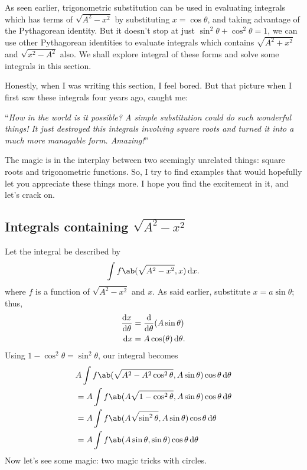 As seen earlier, trigonometric substitution can be used in evaluating integrals which has terms of \(\sqrt{A^2 - x^2}\) by substituting \(x = \cos\theta\), and taking advantage of the Pythagorean identity. But it doesn't stop at just \(\sin^2\theta + \cos^2\theta = 1\), we can use other Pythagorean identities to evaluate integrals which contains \(\sqrt{A^2 + x^2}\) and \(\sqrt{x^2 - A^2}\) also. We shall explore integral of these forms and solve some integrals in this section.

Honestly, when I was writing this section, I feel bored. But that picture when I first saw these integrals four years ago, caught me:
\begin{displayquote}
  \enquote{\emph{How in the world is it possible? A simple substitution could do such wonderful things! It just destroyed this integrals involving square roots and turned it into a much more managable form. Amazing!}}
\end{displayquote}
The magic is in the interplay between two seemingly unrelated things: square roots and trigonometric functions. So, I try to find examples that would hopefully let you appreciate these things more. I hope you find the excitement in it, and let's crack on.

\subsection*{Integrals containing \(\sqrt{A^2 - x^2}\)}

Let the integral be described by
\begin{equation}
  \int f\ab(\sqrt{A^2 - x^2}, x)\odif{x}.
\end{equation}
where \(f\) is a function of \(\sqrt{A^2 - x^2}\) and \(x\). As said earlier, substitute \(x = a\sin\theta\); thus,
\begin{align}
  \odv{x}{\theta} & = \odv*{(A\sin\theta)}{\theta} \\
  \odif{x}        & = A\cos(\theta)\odif{\theta}.
\end{align}
Using \(1 - \cos^2\theta = \sin^2\theta\), our integral becomes
\begin{align}
   & A\int f\ab(\sqrt{A^2 - A^2\cos^2\theta}, A\sin\theta)\cos\theta\odif{\theta} \nonumber \\
   & = A\int f\ab(A\sqrt{1 - \cos^2\theta}, A\sin\theta)\cos\theta\odif{\theta}             \\
   & = A\int f\ab(A\sqrt{\sin^2\theta}, A\sin\theta)\cos\theta\odif{\theta}                 \\
   & = A\int f\ab(A\sin\theta, \sin\theta)\cos\theta\odif{\theta}
\end{align}
Now let's see some magic: two magic tricks with circles.

